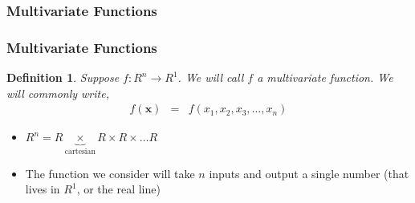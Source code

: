\documentclass{beamer}
\newtheorem{defn}{Definition}
\numberwithin{equation}{section}
\begin{document}
\begin{frame}
\frametitle{Multivariate Functions}













\end{frame}




\begin{frame}
\frametitle{Multivariate Functions}

\begin{defn}
Suppose $f:R^{n} \rightarrow R^{1}$.  We will call $f$ a multivariate function.  We will commonly write,
\begin{eqnarray}
f(\boldsymbol{x}) & = & f(x_{1}, x_{2}, x_{3}, \hdots, x_{n} ) \nonumber 
\end{eqnarray}

\end{defn}

\begin{itemize}
\item[-] $R^{n} = R \underbrace{\times}_{\text{cartesian}} R \times R \times \hdots R $
\item[-] The function we consider will take $n$ inputs and output a single number (that lives in $R^{1}$, or the real line)
\end{itemize} 

\end{frame}
\end{document}

